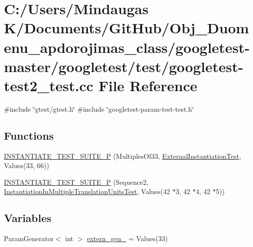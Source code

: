 \hypertarget{googletest-master_2googletest_2test_2googletest-test2__test_8cc}{}\section{C\+:/\+Users/\+Mindaugas K/\+Documents/\+Git\+Hub/\+Obj\+\_\+\+Duomenu\+\_\+apdorojimas\+\_\+class/googletest-\/master/googletest/test/googletest-\/test2\+\_\+test.cc File Reference}
\label{googletest-master_2googletest_2test_2googletest-test2__test_8cc}
{\ttfamily \#include \char`\"{}gtest/gtest.\+h\char`\"{}}\newline
{\ttfamily \#include \char`\"{}googletest-\/param-\/test-\/test.\+h\char`\"{}}\newline
\subsection*{Functions}
\begin{DoxyCompactItemize}
\item 
\mbox{\hyperlink{googletest-master_2googletest_2test_2googletest-test2__test_8cc_a9092fbc5f642e0be66474b214fae76c9}{I\+N\+S\+T\+A\+N\+T\+I\+A\+T\+E\+\_\+\+T\+E\+S\+T\+\_\+\+S\+U\+I\+T\+E\+\_\+P}} (Multiples\+Of33, \mbox{\hyperlink{class_external_instantiation_test}{External\+Instantiation\+Test}}, Values(33, 66))
\item 
\mbox{\hyperlink{googletest-master_2googletest_2test_2googletest-test2__test_8cc_a636f24ec7688ea5d70c09b8b73639e55}{I\+N\+S\+T\+A\+N\+T\+I\+A\+T\+E\+\_\+\+T\+E\+S\+T\+\_\+\+S\+U\+I\+T\+E\+\_\+P}} (Sequence2, \mbox{\hyperlink{class_instantiation_in_multiple_translation_units_test}{Instantiation\+In\+Multiple\+Translation\+Units\+Test}}, Values(42 $\ast$3, 42 $\ast$4, 42 $\ast$5))
\end{DoxyCompactItemize}
\subsection*{Variables}
\begin{DoxyCompactItemize}
\item 
Param\+Generator$<$ int $>$ \mbox{\hyperlink{googletest-master_2googletest_2test_2googletest-test2__test_8cc_a4c9bff52d70a57c0563599a919c33bc9}{extern\+\_\+gen\+\_}} = Values(33)
\end{DoxyCompactItemize}


